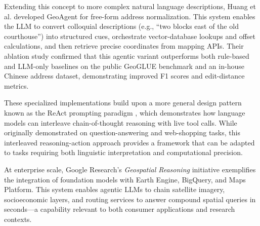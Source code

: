 Extending this concept to more complex natural language descriptions,
Huang et al.\DIFaddbegin \DIFadd{~}\DIFaddend \citep{Huang2024_geoagent} developed GeoAgent for free-form
address normalization. This system enables the LLM to convert colloquial
descriptions (e.g., ``two blocks east of the old courthouse'') into
structured cues, orchestrate vector-database lookups and offset
calculations, and then retrieve precise coordinates from mapping APIs.
Their ablation study confirmed that this agentic variant outperforms
both rule-based and LLM-only baselines on the public GeoGLUE benchmark
\DIFaddbegin {}\DIFaddend and an in-house
Chinese address dataset, demonstrating improved F1 scores and
edit-distance metrics.

These specialized implementations build upon a more general design
pattern known as the ReAct prompting paradigm \citep{yao2023react},
which demonstrates how language models can interleave chain-of-thought
reasoning with live tool calls. While originally demonstrated on
question-answering and web-shopping tasks, this interleaved
reasoning-action approach provides a framework that can be adapted to
tasks requiring both linguistic interpretation and computational
precision.

At enterprise scale, Google Research's \emph{Geospatial Reasoning}
initiative \citep{GoogleResearch2025_geospatial} exemplifies the
integration of foundation models with Earth Engine, BigQuery, and Maps
Platform. This system enables agentic LLMs to chain satellite imagery,
socioeconomic layers, and routing services to answer compound spatial
queries in seconds---a capability relevant to both consumer applications
and research contexts.


